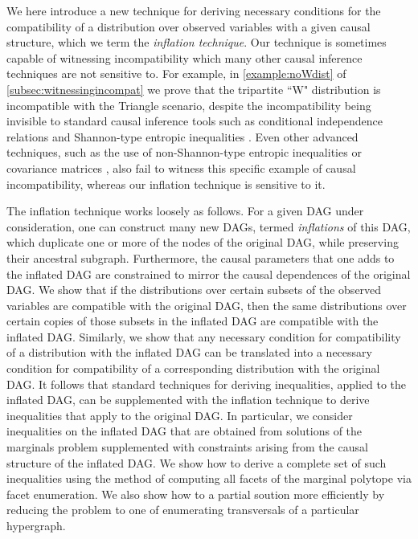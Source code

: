 We here introduce a new technique for deriving necessary conditions for the compatibility of a distribution over observed variables with a given causal structure, which we term the {\em inflation technique}. Our technique is sometimes capable of witnessing incompatibility which many other causal inference techniques are not sensitive to. For example, in \cref{example:noWdist} of \cref{subsec:witnessingincompat} we prove that the tripartite ``W" distribution is incompatible with the Triangle scenario, despite the incompatibility being invisible to standard causal inference tools such as conditional independence relations and Shannon-type entropic inequalities \cite{fritz2013marginal,chaves2014novel,chaves2014informationinference}. Even other advanced techniques, such as the use of non-Shannon-type entropic inequalities \cite{weilenmann2016entropic} or covariance matrices \citet{kela2016covariance}, also fail to witness this specific example of causal incompatibility, whereas our inflation technique is sensitive to it.


The inflation technique works loosely as follows. For a given DAG under consideration, one can construct many new DAGs, termed {\em inflations} of this DAG, which duplicate one or more of the nodes of the original DAG, while preserving their ancestral subgraph.  Furthermore, the causal parameters that one adds to the inflated DAG are constrained to mirror the causal dependences of the original DAG.  We show that if the distributions over certain subsets of the observed variables are compatible with the original DAG, then the same distributions over certain copies of those subsets in the inflated DAG are compatible with the inflated DAG.  Similarly, we show that any necessary condition for compatibility of a distribution with the inflated DAG can be translated into a necessary condition for compatibility of a corresponding distribution with the original DAG.  It follows that standard techniques for deriving inequalities, applied to the inflated DAG, can be supplemented with the inflation technique to derive inequalities that apply to the original DAG.  In particular, we consider inequalities on the inflated DAG that are obtained from solutions of the marginals problem supplemented with constraints arising from the causal structure of the inflated DAG.   We show how to derive a complete set of such inequalities using the method of computing all facets of the marginal polytope via facet enumeration.  We also show how to a partial soution more efficiently by reducing the problem to one of enumerating transversals of a particular hypergraph.

